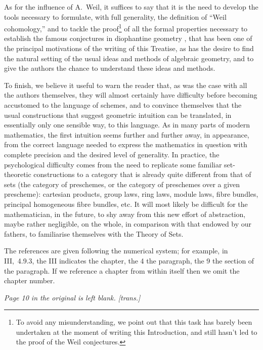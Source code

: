 As for the influence of A.~Weil, it suffices to say that it is the need to
develop the tools necessary to formulate, with full generality, the definition
of ``Weil cohomology,'' and to tackle the proof\footnote{To avoid any
misunderstanding, we point out that this task has barely been undertaken at the
moment of writing this Introduction, and still hasn't led to the proof of the
Weil conjectures.} of all the formal properties necessary to establish the
famous conjectures in diophantine geometry \cite{19}, that has been one of the
principal motivations of the writing of this Treatise, as has the desire to find
the natural setting of the usual ideas and methods of algebraic geometry, and to
give the authors the chance to understand these ideas and methods.

\asttri

To finish, we believe it useful to warn the reader that, as was the case with
all the authors themselves, they will almost certainly have difficulty before
becoming accustomed to the language of schemes, and to convince themselves that
the usual constructions that suggest geometric intuition can be translated, in
essentially only one sensible way, to this language. As in many parts of modern
mathematics, the first intuition seems further and further away, in appearance,
from the correct language needed to express the mathematics in question with
complete precision and the desired level of generality. In practice, the
psychological difficulty comes from the need to replicate some familiar
set-theoretic constructions to a category that is already quite different from
that of sets (the category of preschemes, or the category of preschemes over a
given prescheme): cartesian products, group laws, ring laws, module laws, fibre
bundles, principal homogeneous fibre bundles, etc. It will most likely
be difficult for the mathematician, in the future, to shy away from this new
effort of abstraction, maybe rather negligible, on the whole, in comparison with
that endowed by our fathers, to familiarise themselves with the Theory of Sets.

\asttri

The references are given following the numerical system; for example, in
III,~4.9.3, the III indicates the chapter, the 4 the paragraph, the 9 the
section of the paragraph. If we reference a chapter from within itself then we
omit the chapter number.

\bigskip

\emph{Page 10 in the original is left blank. [trans.]}

